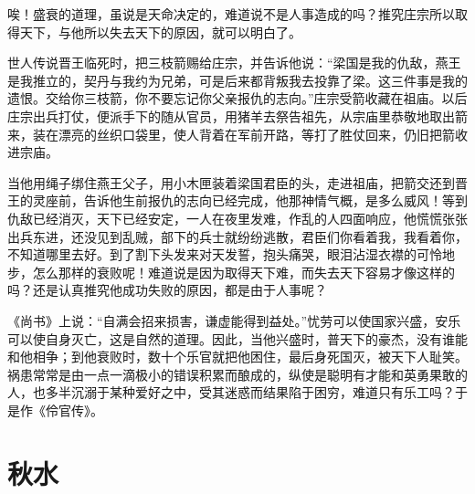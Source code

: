 \documentclass[12pt,UTF-8,openany]{ctexbook}
\begin{document}
\begin{normalsize}
    
    唉！盛衰的道理，虽说是天命决定的，难道说不是人事造成的吗？推究庄宗所以取得天下，与他所以失去天下的原因，就可以明白了。
    
    世人传说晋王临死时，把三枝箭赐给庄宗，并告诉他说：“梁国是我的仇敌，燕王是我推立的，契丹与我约为兄弟，可是后来都背叛我去投靠了梁。这三件事是我的遗恨。交给你三枝箭，你不要忘记你父亲报仇的志向。”庄宗受箭收藏在祖庙。以后庄宗出兵打仗，便派手下的随从官员，用猪羊去祭告祖先，从宗庙里恭敬地取出箭来，装在漂亮的丝织口袋里，使人背着在军前开路，等打了胜仗回来，仍旧把箭收进宗庙。
    
    当他用绳子绑住燕王父子，用小木匣装着梁国君臣的头，走进祖庙，把箭交还到晋王的灵座前，告诉他生前报仇的志向已经完成，他那神情气概，是多么威风！等到仇敌已经消灭，天下已经安定，一人在夜里发难，作乱的人四面响应，他慌慌张张出兵东进，还没见到乱贼，部下的兵士就纷纷逃散，君臣们你看着我，我看着你，不知道哪里去好。到了割下头发来对天发誓，抱头痛哭，眼泪沾湿衣襟的可怜地步，怎么那样的衰败呢！难道说是因为取得天下难，而失去天下容易才像这样的吗？还是认真推究他成功失败的原因，都是由于人事呢？
    
    《尚书》上说：“自满会招来损害，谦虚能得到益处。”忧劳可以使国家兴盛，安乐可以使自身灭亡，这是自然的道理。因此，当他兴盛时，普天下的豪杰，没有谁能和他相争；到他衰败时，数十个乐官就把他困住，最后身死国灭，被天下人耻笑。祸患常常是由一点一滴极小的错误积累而酿成的，纵使是聪明有才能和英勇果敢的人，也多半沉溺于某种爱好之中，受其迷惑而结果陷于困穷，难道只有乐工吗？于是作《伶官传》。
    
\end{normalsize}



\chapter{秋水}
\end{document}
